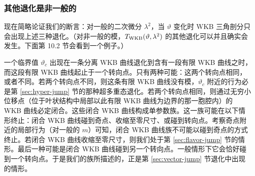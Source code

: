 \subsubsection{其他退化是非一般的}

现在简略论证我们的断言：对一般的二次微分 $\lambda^2$，当 $\vartheta$ 变化时 WKB 三角剖分只会出现上述三种退化。（对非一般的模，$T_{\rm WKB}(\vartheta, \lambda^2)$ 的其他退化可以并且确实会发生。下面第 10.2 节会看到一个例子。）%

一个临界值 $\vartheta_c$ 出现在一条分离 WKB 曲线退化到含有一段有限 WKB 曲线之时，而这段有限 WKB 曲线起止于一个转向点。只有两种可能：这两个转向点相同，或者不同。若两个转向点不同，则这条有限 WKB 曲线没有模，$\vartheta_c$ 附近的行为必是第 \ref{sec:hyper-jump} 节的那种超多重态退化。若两个转向点相同，则通过无穷小位移点（位于叶状结构中局部以此有限 WKB 曲线为边界的那一胞腔内）的 WKB 曲线必定闭合。这些闭合 WKB 曲线构成单参数族。这一族可能在以下情形终止：闭合 WKB 曲线碰到奇点、收缩至零尺寸、或碰到转向点。考察奇点附近的局部行为（对一般的 $m$）可知，闭合 WKB 曲线族不可能以碰到奇点的方式终止。若闭合 WKB 曲线收缩至零尺寸，则我们处于第 \ref{sec:flavor-jump} 节的情形。最后一种可能是闭合 WKB 曲线碰到另一个转向点。一般情形下它会恰好碰到一个转向点。于是我们的族所描述的，正是第 \ref{sec:vector-jump} 节退化中出现的情形。
